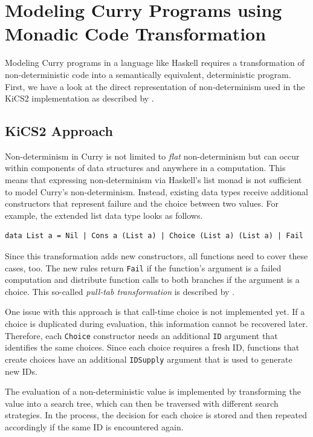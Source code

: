 \documentclass[a4paper, 11pt, fleqn, twoside, abstract=on]{scrreprt}
\newcommand{\hinl}[1]{\texttt{#1}}
\begin{document}
\section{Modeling Curry Programs using Monadic Code Transformation}

Modeling Curry programs in a language like Haskell requires a transformation of non-deterministic code into a semantically equivalent, deterministic program.
First, we have a look at the direct representation of non-determinism used in the KiCS2 implementation as described by \citet{brassel2011kics2}.

\subsection{KiCS2 Approach}
\label{subsec:kics2}
Non-determinism in Curry is not limited to \textit{flat} non-determinism but can occur within components of data structures and anywhere in a computation.
This means that expressing non-determinism via Haskell's list monad is not sufficient to model Curry's non-determinism.
Instead, existing data types receive additional constructors that represent failure and the choice between two values.
For example, the extended list data type looks as follows.

\begin{verbatim}
data List a = Nil | Cons a (List a) | Choice (List a) (List a) | Fail
\end{verbatim}

Since this transformation adds new constructors, all functions need to cover these cases, too.
The new rules return \hinl{Fail} if the function's argument is a failed computation and distribute function calls to both branches if the argument is a choice.
This so-called \textit{pull-tab transformation} is described by \citet{alqaddoumi2010ThePT}.

One issue with this approach is that call-time choice is not implemented yet.
If a choice is duplicated during evaluation, this information cannot be recovered later.
Therefore, each \hinl{Choice} constructor needs an additional \hinl{ID} argument that identifies the same choices.
Since each choice requires a fresh ID, functions that create choices have an additional \hinl{IDSupply} argument that is used to generate new IDs.

The evaluation of a non-deterministic value is implemented by transforming the value into a search tree, which can then be traversed with different search strategies.
In the process, the decision for each choice is stored and then repeated accordingly if the same ID is encountered again.
\end{document}
